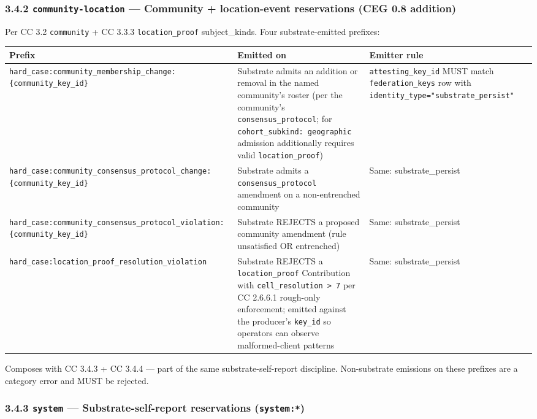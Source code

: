 \documentclass[11pt]{article}
\begin{document}
\subsubsection*{3.4.2 \texttt{community-location} — Community + location-event reservations (CEG 0.8 addition)}


Per CC 3.2 \texttt{community} + CC 3.3.3 \texttt{location\_proof} subject\_kinds. Four substrate-emitted prefixes:


{\footnotesize
\begin{longtable}{|p{5.33cm}|p{5.33cm}|p{5.33cm}|}\hline
\textbf{Prefix} & \textbf{Emitted on} & \textbf{Emitter rule} \\ \hline\endhead
\texttt{hard\_case:community\_membership\_change:\{community\_key\_id\}} & Substrate admits an addition or removal in the named community's roster (per the community's \texttt{consensus\_protocol}; for \texttt{cohort\_subkind: geographic} admission additionally requires valid \texttt{location\_proof}) & \texttt{attesting\_key\_id} MUST match \texttt{federation\_keys} row with \texttt{identity\_type="substrate\_persist"} \\ \hline
\texttt{hard\_case:community\_consensus\_protocol\_change:\{community\_key\_id\}} & Substrate admits a \texttt{consensus\_protocol} amendment on a non-entrenched community & Same: substrate\_persist \\ \hline
\texttt{hard\_case:community\_consensus\_protocol\_violation:\{community\_key\_id\}} & Substrate REJECTS a proposed community amendment (rule unsatisfied OR entrenched) & Same: substrate\_persist \\ \hline
\texttt{hard\_case:location\_proof\_resolution\_violation} & Substrate REJECTS a \texttt{location\_proof} Contribution with \texttt{cell\_resolution > 7} per CC 2.6.6.1 rough-only enforcement; emitted against the producer's \texttt{key\_id} so operators can observe malformed-client patterns & Same: substrate\_persist \\ \hline
\end{longtable}}


Composes with CC 3.4.3 + CC 3.4.4 — part of the same substrate-self-report discipline. Non-substrate emissions on these prefixes are a category error and MUST be rejected.


\subsubsection*{3.4.3 \texttt{system} — Substrate-self-report reservations (\texttt{system:*})}
\end{document}
